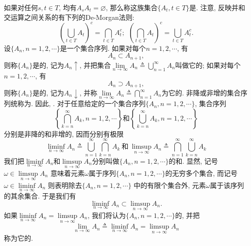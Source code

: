 如果对任何$s,t\in T$, 均有$A_sA_t = \varnothing$, 那么称这族集合$\{A_t,t\in T\}$是. 注意, 反映并和交运算之间关系的有下列的De-Morgan法则:
\begin{equation}
\left(\bigcup_{t\in T}A_t\right)^c = \bigcap_{t\in T}A_t^c;~~\left(\bigcap_{t\in T}A_t\right)^c = \bigcup_{t\in T}A_t^c.\label{eq:De-Morgan}
\end{equation}
设$\{A_n,n=1,2,\cdots\}$是一个集合序列. 如果对每个$n = 1,2,\cdots$, 有\begin{equation}
A_n\subset A_{n+1},
\end{equation}
则称$\{A_n\}$是的, 记为$A_n\uparrow$, 并把集合$\lim\limits_{n\to\infty}A_n\triangleq \bigcup\limits_{n = 1}^{\infty}A_n$叫做它的; 如果对每个$n = 1,2,\cdots$, 有
\begin{equation}
A_n\supset A_{n+1},
\end{equation}
则称$\{A_n\}$是的, 记为$A_n\downarrow$, 并称$\lim\limits_{n\to\infty}A_n\triangleq \bigcap\limits_{n = 1}^{\infty}A_n$为它的. 非降或非增的集合序列统称为. 因此, . 对于任意给定的一个集合序列$\{A_n,n=1,2,\cdots\}$, 集合序列
\begin{equation}
\left\{ \bigcap_{k=n}^\infty A_k,n=1,2,\cdots\right\}\text{和}\left\{ \bigcup_{k=n}^\infty A_k,n=1,2,\cdots\right\}
\end{equation}
分别是非降的和非增的, 因而分别有极限
\begin{equation}
\liminf_{n\to\infty}A_n\triangleq \bigcup_{n=1}^{\infty}\bigcap_{k=n}^{\infty}A_k ~\text{和}~\limsup_{n\to\infty}A_n\triangleq \bigcap_{n=1}^{\infty}\bigcup_{k=n}^{\infty}A_k 
\end{equation}
我们把$\liminf\limits_{n\to\infty}A_n$和$\limsup\limits_{n\to\infty}A_n$分别叫做$\{A_n,n=1,2,\cdots\}$的和. 显然, 记号$\omega\in\limsup\limits_{n\to\infty}A_n$ 意味着元素$\omega$属于序列$\{A_n,n=1,2,\cdots\}$的无穷多个集合, 而记号$\omega\in\liminf\limits_{n\to\infty}A_n$ 则表明除去$\{A_n,n=1,2,\cdots\}$ 中的有限个集合外, 元素$\omega$属于该序列的其余集合. 于是我们有
\begin{equation}
\liminf_{n\to\infty}A_n\subset\limsup_{n\to\infty}A_n.
\end{equation}
如果$\liminf\limits_{n\to\infty}A_n = \limsup\limits_{n\to\infty}A_n$, 我们将认为$\{A_n,n=1,2,\cdots\}$的, 并把
\begin{equation}
\lim_{n\to\infty}A_n \triangleq \liminf_{n\to\infty}A_n = \limsup_{n\to\infty}A_n
\end{equation}
称为它的.


